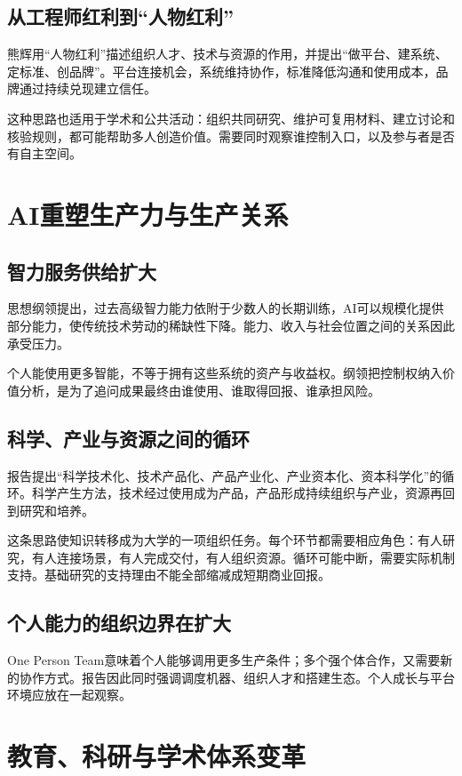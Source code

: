 \documentclass[UTF8,zihao=-4,fontset=fandol,oneside,openany]{ctexbook}
\begin{document}
\subsection*{从工程师红利到“人物红利”}
熊辉用“人物红利”描述组织人才、技术与资源的作用，并提出“做平台、建系统、定标准、创品牌”\cite{xiong}。平台连接机会，系统维持协作，标准降低沟通和使用成本，品牌通过持续兑现建立信任。

这种思路也适用于学术和公共活动：组织共同研究、维护可复用材料、建立讨论和核验规则，都可能帮助多人创造价值。需要同时观察谁控制入口，以及参与者是否有自主空间。

\section{AI重塑生产力与生产关系}
\subsection*{智力服务供给扩大}
思想纲领提出，过去高级智力能力依附于少数人的长期训练，AI可以规模化提供部分能力，使传统技术劳动的稀缺性下降\cite{principles}。能力、收入与社会位置之间的关系因此承受压力。

个人能使用更多智能，不等于拥有这些系统的资产与收益权。纲领把控制权纳入价值分析，是为了追问成果最终由谁使用、谁取得回报、谁承担风险。

\subsection*{科学、产业与资源之间的循环}
报告提出“科学技术化、技术产品化、产品产业化、产业资本化、资本科学化”的循环\cite{xiong}。科学产生方法，技术经过使用成为产品，产品形成持续组织与产业，资源再回到研究和培养。

这条思路使知识转移成为大学的一项组织任务。每个环节都需要相应角色：有人研究，有人连接场景，有人完成交付，有人组织资源。循环可能中断，需要实际机制支持。基础研究的支持理由不能全部缩减成短期商业回报。

\subsection*{个人能力的组织边界在扩大}
One Person Team意味着个人能够调用更多生产条件；多个强个体合作，又需要新的协作方式。报告因此同时强调调度机器、组织人才和搭建生态。个人成长与平台环境应放在一起观察。

\section{教育、科研与学术体系变革}
\end{document}
